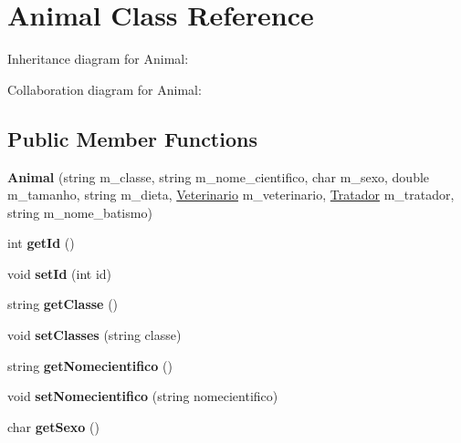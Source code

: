 \hypertarget{classAnimal}{}\section{Animal Class Reference}
\label{classAnimal}


Inheritance diagram for Animal\+:


Collaboration diagram for Animal\+:
\subsection*{Public Member Functions}
\begin{DoxyCompactItemize}
\item 
\mbox{\label{classAnimal_a14640369f5e724db8b31841af98ff602}} 
{\bfseries Animal} (string m\+\_\+classe, string m\+\_\+nome\+\_\+cientifico, char m\+\_\+sexo, double m\+\_\+tamanho, string m\+\_\+dieta, \hyperlink{classVeterinario}{Veterinario} m\+\_\+veterinario, \hyperlink{classTratador}{Tratador} m\+\_\+tratador, string m\+\_\+nome\+\_\+batismo)
\item 
\mbox{\label{classAnimal_a2c27e56355bc2b40d65250da2bb8a102}} 
int {\bfseries get\+Id} ()
\item 
\mbox{\label{classAnimal_af5a262e8a6e04632a48307101494925c}} 
void {\bfseries set\+Id} (int id)
\item 
\mbox{\label{classAnimal_a7e30612d261b18710b85c872a9182368}} 
string {\bfseries get\+Classe} ()
\item 
\mbox{\label{classAnimal_a7a727e5dd62b74f7f261553cd14fa419}} 
void {\bfseries set\+Classes} (string classe)
\item 
\mbox{\label{classAnimal_af43f9dd65385ea1a8006f68088e316d7}} 
string {\bfseries get\+Nomecientifico} ()
\item 
\mbox{\label{classAnimal_a7645bc170d31984c3dd8a78cbb474e3f}} 
void {\bfseries set\+Nomecientifico} (string nomecientifico)
\item 
\mbox{\label{classAnimal_a7349027418d900a9cd7cfc32001b6f7d}} 
char {\bfseries get\+Sexo} ()

\end{DoxyCompactItemize}
